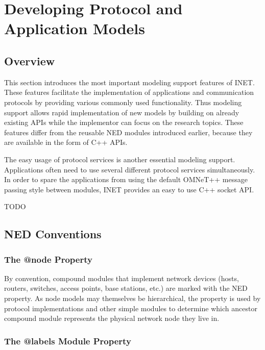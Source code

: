 \chapter{Developing Protocol and Application Models}
\label{cha:developing-models}

\section{Overview}

This section introduces the most important modeling support features of
INET. These features facilitate the implementation of applications and
communication protocols by providing various commonly used functionality.
Thus modeling support allows rapid implementation of new models by building
on already existing APIs while the implementor can focus on the research
topics. These features differ from the reusable NED modules introduced
earlier, because they are available in the form of C++ APIs.

The easy usage of protocol services is another essential modeling support.
Applications often need to use several different protocol services
simultaneously. In order to spare the applications from using the default
OMNeT++ message passing style between modules, INET provides an easy to use
C++ socket API.

\ifdraft TODO
\section{NED Conventions}


\subsection{The @node Property}

By convention, compound modules that implement network devices (hosts,
routers, switches, access points, base stations, etc.) are marked with the
 NED property. As node models may themselves be hierarchical, the
 property is used by protocol implementations and other simple
modules to determine which ancestor compound module represents the physical
network node they live in.

\subsection{The @labels Module Property}

